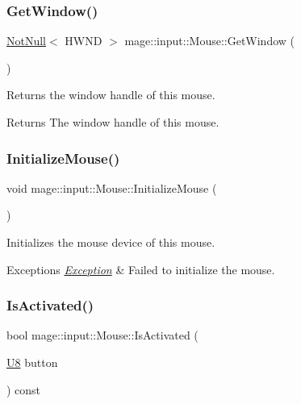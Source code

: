 \subsubsection{\texorpdfstring{Get\+Window()}{GetWindow()}}
{\footnotesize\ttfamily \mbox{\hyperlink{namespacemage_a8769f9d670d6b585ea306cb1062af94b}{Not\+Null}}$<$ H\+W\+ND $>$ mage\+::input\+::\+Mouse\+::\+Get\+Window (\begin{DoxyParamCaption}{ }\end{DoxyParamCaption})\hspace{0.3cm}{\ttfamily [noexcept]}}

Returns the window handle of this mouse.

\begin{DoxyReturn}{Returns}
The window handle of this mouse. 
\end{DoxyReturn}
\mbox{\label{classmage_1_1input_1_1_mouse_a8209bbaf255c2e93ee1cd8f3937cd8ab}} 
\subsubsection{\texorpdfstring{Initialize\+Mouse()}{InitializeMouse()}}
{\footnotesize\ttfamily void mage\+::input\+::\+Mouse\+::\+Initialize\+Mouse (\begin{DoxyParamCaption}{ }\end{DoxyParamCaption})\hspace{0.3cm}{\ttfamily [private]}}

Initializes the mouse device of this mouse.


\begin{DoxyExceptions}{Exceptions}
{\em \mbox{\hyperlink{classmage_1_1_exception}{Exception}}} & Failed to initialize the mouse. \\
\hline
\end{DoxyExceptions}
\mbox{\label{classmage_1_1input_1_1_mouse_a00d4060759a1673e7b57b088b687531c}} 
\subsubsection{\texorpdfstring{Is\+Activated()}{IsActivated()}}
{\footnotesize\ttfamily bool mage\+::input\+::\+Mouse\+::\+Is\+Activated (\begin{DoxyParamCaption}\item[{\mbox{\hyperlink{namespacemage_a30677c03d683c4c35630c25f6ff3fb7f}{U8}}}]{button }\end{DoxyParamCaption}) const\hspace{0.3cm}{\ttfamily [noexcept]}}

